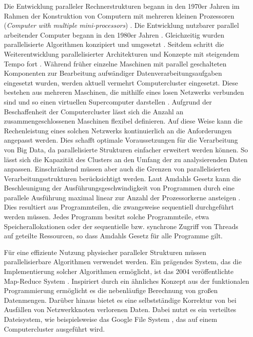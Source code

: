 Die Entwicklung paralleler Rechnerstrukturen begann in den 1970er Jahren im Rahmen der Konstruktion von Computern mit mehreren kleinen Prozessoren (\textit{Computer with multiple mini-processors}) \cite{Bell1971, Wulf1972}. Die Entwicklung nutzbarer parallel arbeitender Computer begann in den 1980er Jahren \cite{Seitz1985}. Gleichzeitig wurden parallelisierte Algorithmen konzipiert und umgesetzt \cite{Borodin1985}. Seitdem schritt die Weiterentwicklung parallelisierter Architekturen und Konzepte mit steigendem Tempo fort \cite{Trew2012}. Während früher einzelne Maschinen mit parallel geschalteten Komponenten zur Bearbeitung aufwändiger Datenverarbeitungsaufgaben eingesetzt wurden, werden aktuell vermehrt Computercluster eingesetzt. Diese bestehen aus mehreren Maschinen, die mithilfe eines losen Netzwerks verbunden sind und so einen virtuellen Supercomputer darstellen \cite{Hwang2013}. Aufgrund der Beschaffenheit der Computercluster lässt sich die Anzahl an zusammengeschlossenen Maschinen flexibel definieren. Auf diese Weise kann die Rechenleistung eines solchen Netzwerks kontinuierlich an die Anforderungen angepasst werden. Dies schafft optimale Voraussetzungen für die Verarbeitung von Big Data, da parallelisierte Strukturen einfacher erweitert werden können. So lässt sich die Kapazität des Clusters an den Umfang der zu analysierenden Daten anpassen. Einschränkend müssen aber auch die Grenzen von parallelisierten Verarbeitungsstrukturen berücksichtigt werden. Laut Amdahls Gesetz kann die Beschleunigung der Ausführungsgeschwindigkeit von Programmen durch eine parallele Ausführung maximal linear zur Anzahl der Prozessorkerne ansteigen \cite{Amdahl1967}. Dies resultiert aus Programmteilen, die zwangsweise sequentiell durchgeführt werden müssen. Jedes Programm besitzt solche Programmteile, etwa Speicherallokationen oder der sequentielle bzw. synchrone Zugriff von Threads auf geteilte Ressourcen, so dass Amdahls Gesetz für alle Programme gilt.

Für eine effiziente Nutzung physischer paralleler Strukturen müssen parallelisierbare Algorithmen verwendet werden. Ein prägendes System, das die Implementierung solcher Algorithmen ermöglicht, ist das 2004 veröffentlichte Map-Reduce System \cite{Dean2004}. Inspiriert durch ein ähnliches Konzept aus der funktionalen Programmierung ermöglicht es die nebenläufige Berechnung von großen Datenmengen. Darüber hinaus bietet es eine selbstständige Korrektur von bei Ausfällen von Netzwerkknoten verlorenen Daten. Dabei nutzt es ein verteiltes Dateisystem, wie beispielsweise das Google File System \cite{Ghemawat2003}, das auf einem Computercluster ausgeführt wird.

